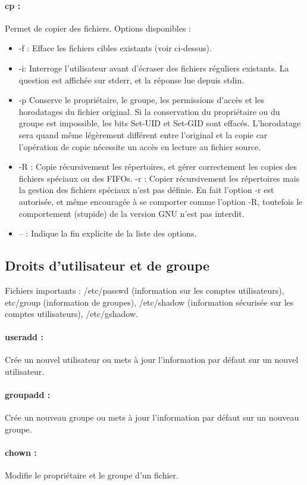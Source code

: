 \documentclass{article}[12pt]
\begin{document}
\paragraph{cp : } Permet de copier des fichiers. Options disponibles : 
\begin{itemize}
\item -f : Efface les fichiers cibles existants (voir ci-dessus).
\item -i: Interroge l'utilisateur avant d'écraser des fichiers réguliers existants. La question est affichée sur stderr, et la réponse lue depuis stdin.
\item -p Conserve le propriétaire, le groupe, les permissions d'accès et les horodatages du fichier original. Si la conservation du propriétaire ou du groupe est impossible, les bits Set-UID et Set-GID sont effacés. L'horodatage sera quand même légèrement différent entre l'original et la copie car l'opération de copie nécessite un accès en lecture au fichier source.
\item -R : Copie récursivement les répertoires, et gérer correctement les copies des fichiers spéciaux ou des FIFOs.
-r : Copier récursivement les répertoires mais la gestion des fichiers spéciaux n'est pas définie. En fait l'option -r est autorisée, et même encouragée à se comporter comme l'option -R, toutefois le comportement (stupide) de la version GNU n'est pas interdit.
\item -- : Indique la fin explicite de la liste des options.
\end{itemize}
\subsection{Droits d'utilisateur et de groupe}
Fichiers importants : /etc/passwd (information sur les comptes utilisateurs), etc/group (information de groupes), /etc/shadow (information sécurisée sur les comptes utilisateurs), /etc/gshadow.
\paragraph{useradd : } Crée un nouvel utilisateur ou mets à jour l'information par défaut sur un nouvel utilisateur.
\paragraph{groupadd : } Crée un nouveau groupe ou mets à jour l'information par défaut sur un nouveau groupe.
\paragraph{chown : } Modifie le propriétaire et le groupe d'un fichier.
\end{document}
